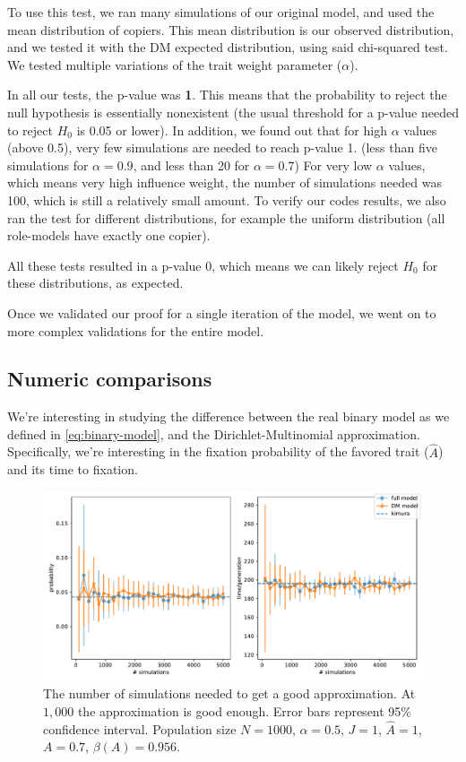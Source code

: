 \documentclass[11pt]{article}
\begin{document}
To use this test, we ran many simulations of our original model, and used the mean distribution of copiers. This mean distribution is our observed distribution, and we tested it with the DM expected distribution, using said chi-squared test.
We tested multiple variations of the trait weight parameter ($\alpha$).

In all our tests, the p-value was \textbf{1}. This means that the probability to reject the null hypothesis is essentially nonexistent (the usual threshold for a p-value needed to reject $H_0$ is 0.05 or lower). 
In addition, we found out that for high $\alpha$ values (above 0.5), very few simulations are needed to reach p-value 1. (less than five simulations for $\alpha=0.9$, and less than 20 for $\alpha=0.7$)
For very low $\alpha$ values, which means very high influence weight, the number of simulations needed was 100, which is still a relatively small amount.
To verify our codes results, we also ran the test for different distributions, for example the uniform distribution (all role-models have exactly one copier).

All these tests resulted in a p-value 0, which means we can likely reject $H_0$ for these distributions, as expected.

Once we validated our proof for a single iteration of the model, we went on to more complex validations for the entire model.


\subsection{Numeric comparisons}
We're interesting in studying the difference between the real binary model as we defined in \cref{eq:binary-model}, and the Dirichlet-Multinomial approximation. Specifically, we're interesting in the fixation probability of the favored trait ($\hat{A}$) and its time to fixation.

\begin{figure}
    \includegraphics[width=\linewidth]{../figures/binary/num_sims.pdf}
  \caption{The number of simulations needed to get a good approximation. At $1,000$ the approximation is good enough. Error bars represent 95\% confidence interval. Population size $N=1000$, $\alpha=0.5$, $J=1$, $\hat{A}=1$,$A=0.7$, $\beta(A)=0.956$.}	
  \label{fig:num_sims}
\end{figure}
\end{document}
